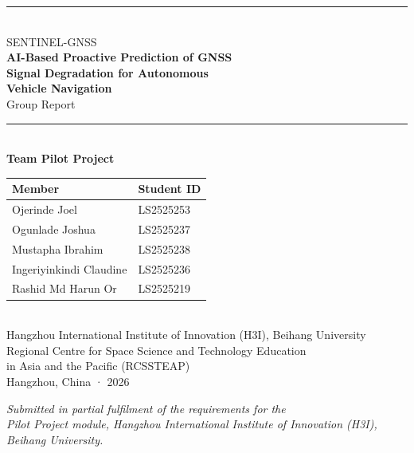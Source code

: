 \documentclass[12pt,a4paper]{article}
\begin{document}
\begin{titlepage}
  \centering
  \vspace*{1cm}
  {\color{buaaNavy}\rule{\linewidth}{2pt}}\\[0.5cm]
  {\normalsize\color{buaaBlue} SENTINEL-GNSS}\\[0.25cm]
  {\LARGE\bfseries\color{buaaNavy} AI-Based Proactive Prediction of GNSS\\[0.2cm]
   Signal Degradation for Autonomous\\[0.4cm]
   Vehicle Navigation}\\[0.45cm]
  {\large\color{buaaBlue} Group Report}\\[0.5cm]
  {\color{buaaNavy}\rule{\linewidth}{2pt}}\\[1.5cm]

  {\large\bfseries Team Pilot Project}\\[0.5cm]

  \begin{tabular}{ll}
    \toprule
    \textbf{Member} & \textbf{Student ID} \\
    \midrule
    Ojerinde Joel          & LS2525253 \\
    Ogunlade Joshua        & LS2525237 \\
    Mustapha Ibrahim       & LS2525238 \\
    Ingeriyinkindi Claudine & LS2525236 \\
    Rashid Md Harun Or     & LS2525219 \\
    \bottomrule
  \end{tabular}\\[1.5cm]

  {\large Hangzhou International Institute of Innovation (H3I), Beihang University}\\[0.3cm]
  {\large Regional Centre for Space Science and Technology Education}\\[0.15cm]
  {\large in Asia and the Pacific (RCSSTEAP)}\\[0.3cm]
  {\large Hangzhou, China · 2026}\\[1cm]

  \begin{minipage}{0.85\textwidth}
    \centering
    \itshape
    Submitted in partial fulfilment of the requirements for the \\
    Pilot Project module, Hangzhou International Institute of Innovation (H3I),
    Beihang University.
  \end{minipage}
\end{titlepage}
\end{document}
